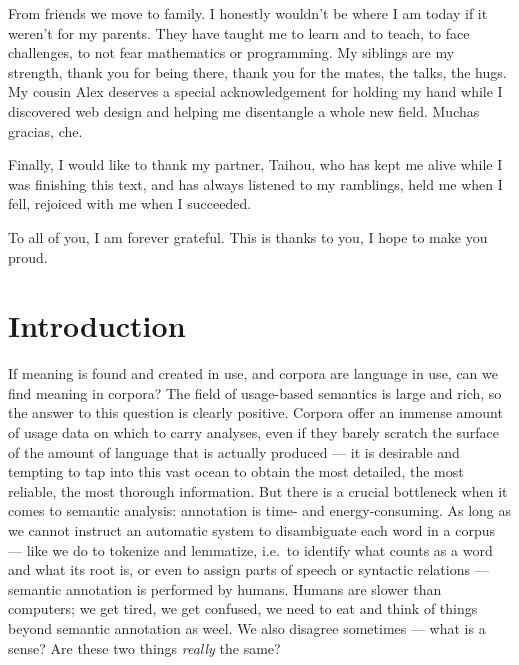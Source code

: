 \documentclass[
]{book}
\begin{document}
From friends we move to family. I honestly wouldn't be where I am today if it weren't for my parents. They have taught me to learn and to teach, to face challenges, to not fear mathematics or programming. My siblings are my strength, thank you for being there, thank you for the mates, the talks, the hugs. My cousin Alex deserves a special acknowledgement for holding my hand while I discovered web design and helping me disentangle a whole new field. Muchas gracias, che.

Finally, I would like to thank my partner, Taihou, who has kept me alive while I was finishing this text, and has always listened to my ramblings, held me when I fell, rejoiced with me when I succeeded.

To all of you, I am forever grateful. This is thanks to you, I hope to make you proud.

\mainmatter

\fancyhead[LE]{\thepage --- \nouppercase{\leftmark}}
\fancyhead[RO]{\nouppercase{\rightmark} --- \thepage}
\fancyhead[LO,RE]{}
\fancyfoot[C]{}

\hypertarget{intro}{%
\chapter{Introduction}\label{intro}}

If meaning is found and created in use, and corpora are language in use, can we find meaning in corpora? The field of usage-based semantics is large and rich, so the answer to this question is clearly positive. Corpora offer an immense amount of usage data on which to carry analyses, even if they barely scratch the surface of the amount of language that is actually produced --- it is desirable and tempting to tap into this vast ocean to obtain the most detailed, the most reliable, the most thorough information. But there is a crucial bottleneck when it comes to semantic analysis: annotation is time- and energy-consuming. As long as we cannot instruct an automatic system to disambiguate each word in a corpus --- like we do to tokenize and lemmatize, i.e.~to identify what counts as a word and what its root is, or even to assign parts of speech or syntactic relations --- semantic annotation is performed by humans. Humans are slower than computers; we get tired, we get confused, we need to eat and think of things beyond semantic annotation as weel. We also disagree sometimes --- what is a sense? Are these two things \emph{really} the same?
\end{document}
